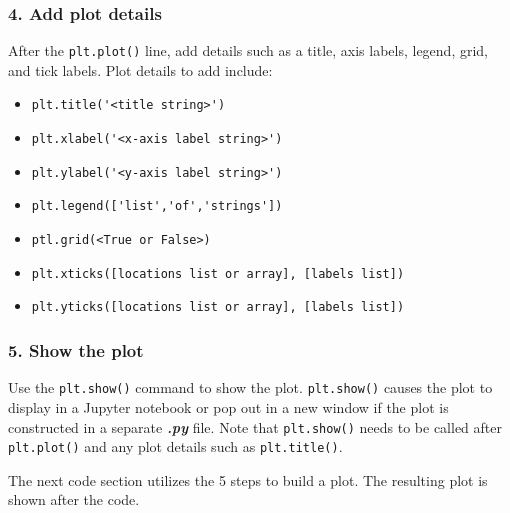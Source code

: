 \documentclass{book}
\providecommand{\tightlist}{%
      \setlength{\itemsep}{0pt}\setlength{\parskip}{0pt}}
\newcommand{\passthrough}[1]{#1}
\begin{document}
\hypertarget{add-plot-details}{%
\subsubsection{4. Add plot details}\label{add-plot-details}}

After the \passthrough{\lstinline!plt.plot()!} line, add details such as
a title, axis labels, legend, grid, and tick labels. Plot details to add
include:

\begin{itemize}
\tightlist
\item
  \passthrough{\lstinline!plt.title('<title string>')!}
\item
  \passthrough{\lstinline!plt.xlabel('<x-axis label string>')!}
\item
  \passthrough{\lstinline!plt.ylabel('<y-axis label string>')!}
\item
  \passthrough{\lstinline!plt.legend(['list','of','strings'])!}
\item
  \passthrough{\lstinline!ptl.grid(<True or False>)!}
\item
  \passthrough{\lstinline!plt.xticks([locations list or array], [labels list])!}
\item
  \passthrough{\lstinline!plt.yticks([locations list or array], [labels list])!}
\end{itemize}

\hypertarget{show-the-plot}{%
\subsubsection{5. Show the plot}\label{show-the-plot}}

Use the \passthrough{\lstinline!plt.show()!} command to show the plot.
\passthrough{\lstinline!plt.show()!} causes the plot to display in a
Jupyter notebook or pop out in a new window if the plot is constructed
in a separate \textbf{\emph{.py}} file. Note that
\passthrough{\lstinline!plt.show()!} needs to be called after
\passthrough{\lstinline!plt.plot()!} and any plot details such as
\passthrough{\lstinline!plt.title()!}.
    




    
        The next code section utilizes the 5 steps to build a plot. The
resulting plot is shown after the code.
    
\end{document}
